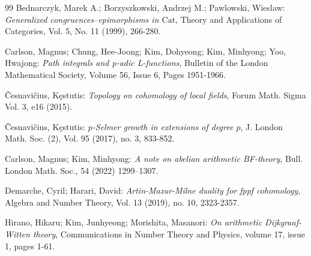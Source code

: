 \documentclass[a4paper]{amsart}
\theoremstyle{definition}
\numberwithin{equation}{section}
\begin{document}
\begin{thebibliography}{99}
 Bednarczyk, Marek A.; Borzyszkowski, Andrzej M.; Pawlowski, Wieslaw: \emph{Generalized congruences--epimorphisms in $\mathrm{Cat}$}, Theory and Applications of Categories, Vol. 5, No. 11 (1999), 266-280.

 Carlson, Magnus; Chung, Hee-Joong; Kim, Dohyeong; Kim, Minhyong; Yoo, Hwajong: \emph{Path integrals and p-adic L-functions}, Bulletin of the London Mathematical Society, Volume 56, Issue 6, Pages 1951-1966.


 

 \v{C}esnavi\v{c}ius, K\k{e}stutis: \emph{Topology on cohomology of local fields}, Forum Math. Sigma Vol. 3, e16 (2015).


 \v{C}esnavi\v{c}ius, K\k{e}stutis: \emph{$p$-Selmer growth in extensions of degree $p$}, J. London Math. Soc. (2), Vol. 95 (2017), no. 3, 833-852.

 Carlson, Magnus; Kim, Minhyong: \emph{A note on abelian arithmetic BF-theory}, Bull. London Math. Soc., 54 (2022) 1299--1307.

 Demarche, Cyril; Harari, David: \emph{Artin-Mazur-Milne duality for fppf cohomology}, Algebra and Number Theory, Vol. 13 (2019), no. 10, 2323-2357.

 Hirano, Hikaru; Kim, Junhyeong; Morishita, Masanori: \emph{On arithmetic Dijkgraaf-Witten theory}, Communications in Number Theory and Physics, volume 17, issue 1, pages 1-61.



\end{thebibliography}
\end{document}
